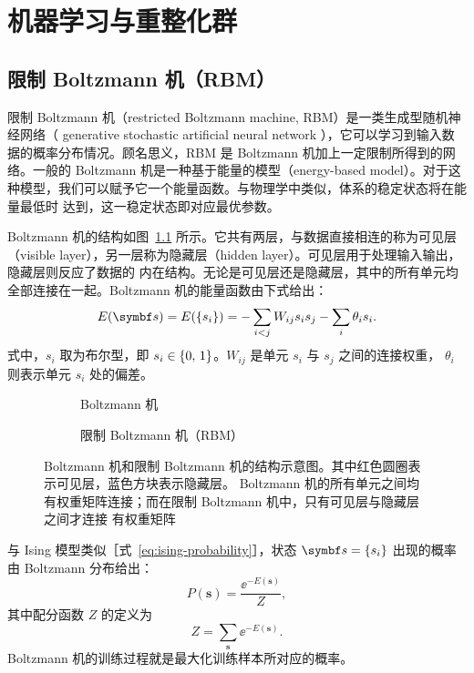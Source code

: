 \chapter{机器学习与重整化群}

\section{限制 Boltzmann 机（RBM）}

限制 Boltzmann 机（restricted Boltzmann machine, RBM）是一类生成型随机神经网络（ generative
stochastic artificial neural network ），它可以学习到输入数据的概率分布情况。顾名思义，RBM 是
Boltzmann 机加上一定限制所得到的网络。一般的 Boltzmann 机是一种基于能量的模型（energy-based
model）。对于这种模型，我们可以赋予它一个能量函数。与物理学中类似，体系的稳定状态将在能量最低时
达到，这一稳定状态即对应最优参数。

Boltzmann 机的结构如图~\ref{fig:boltzmann-machine} 所示。它共有两层，与数据直接相连的称为可见层
（visible layer），另一层称为隐藏层（hidden layer）。可见层用于处理输入输出，隐藏层则反应了数据的
内在结构。无论是可见层还是隐藏层，其中的所有单元均全部连接在一起。Boltzmann 机的能量函数由下式给出：
\begin{equation}
  E(\bm{s}) = E(\q{s_i}) = - \sum_{i<j} W_{ij} s_i s_j - \sum_i \theta_i s_i.
\end{equation}
式中，$s_i$ 取为布尔型，即 $s_i\in{\{0,\,1\}}$。$W_{ij}$ 是单元 $s_i$ 与 $s_j$ 之间的连接权重，
$\theta_i$ 则表示单元 $s_i$ 处的偏差。

\begin{figure}[htb]
  \centering
  \begin{subfigure}[b]{0.45\textwidth}
    \centering
    \caption{Boltzmann 机}
    \label{fig:boltzmann-machine}
  \end{subfigure}
  \begin{subfigure}[b]{0.45\textwidth}
    \centering
    \vspace{0.4cm}
    \caption{限制 Boltzmann 机（RBM）}
    \label{fig:rbm}
  \end{subfigure}
  \caption{Boltzmann 机和限制 Boltzmann 机的结构示意图。其中红色圆圈表示可见层，蓝色方块表示隐藏层。
  Boltzmann 机的所有单元之间均有权重矩阵连接；而在限制 Boltzmann 机中，只有可见层与隐藏层之间才连接
  有权重矩阵}
\end{figure}

与 Ising 模型类似［式~\eqref{eq:ising-probability}］，状态 $\bm{s}=\q{s_i}$ 出现的概率由 Boltzmann
分布给出：
\begin{equation}
  \label{eq:boltzmann-machine-probability}
  P(\bm{s}) = \frac{\ee^{-E(\bm{s})}}{Z},
\end{equation}
其中配分函数 $Z$ 的定义为
\begin{equation}
  Z = \sum_{\bm{s}} \ee^{-E(\bm{s})}.
\end{equation}
Boltzmann 机的训练过程就是最大化训练样本所对应的概率。

